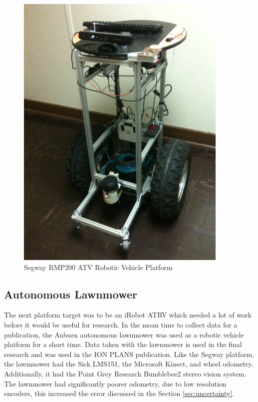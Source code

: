 \documentclass[12pt]{report}
\begin{document}
\begin{figure}[ht]
  \centering
  \includegraphics[width=4in,keepaspectratio]{segway.jpg}
  \caption{Segway RMP200 ATV Robotic Vehicle Platform}
  \label{fig:segway_rmp200}
\end{figure}

\subsection{Autonomous Lawnmower}
The next platform target was to be an iRobot ATRV which needed a lot of work before it would be useful for research.  In the mean time to collect data for a publication, the Auburn autonomous lawnmower was used as a robotic vehicle platform for a short time.  Data taken with the lawnmower is used in the final research and was used in the ION PLANS publication.  Like the Segway platform, the lawnmower had the Sick LMS151, the Microsoft Kinect, and wheel odometry.  Additionally, it had the Point Grey Research Bumblebee2 stereo vision system.  The lawnmower had significantly poorer odometry, due to low resolution encoders, this increased the error discussed in the Section \ref{sec:uncertainty}.
\end{document}
